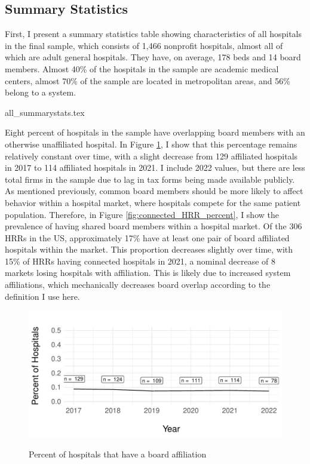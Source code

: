 \documentclass[12pt]{article}
\begin{document}
    \subsection{Summary Statistics}

    First, I present a summary statistics table showing characteristics of all hospitals in the final sample, which consists of 1,466 nonprofit hospitals, almost all of which are adult general hospitals. They have, on average, 178 beds and 14 board members. Almost 40\% of the hospitals in the sample are academic medical centers, almost 70\% of the sample are located in metropolitan areas, and 56\% belong to a system. 

    {all_summarystats.tex}

    Eight percent of hospitals in the sample have overlapping board members with an otherwise unaffiliated hospital. In Figure \ref{fig:connected_percent}, I show that this percentage remains relatively constant over time, with a slight decrease from 129 affiliated hospitals in 2017 to 114 affiliated hospitals in 2021. I include 2022 values, but there are less total firms in the sample due to lag in tax forms being made available publicly. As mentioned previously, common board members should be more likely to affect behavior within a hospital market, where hospitals compete for the same patient population. Therefore, in Figure \ref{fig:connected_HRR_percent}, I show the prevalence of having shared board members within a hospital market. Of the 306 HRRs in the US, approximately 17\% have at least one pair of board affiliated hospitals within the market. This proportion decreases slightly over time, with 15\% of HRRs having connected hospitals in 2021, a nominal decrease of 8 markets losing hospitals with affiliation. This is likely due to increased system affiliations, which mechanically decreases board overlap according to the definition I use here. 


    \begin{figure}[ht!]
        \centering
        \vspace{9mm}
        \caption{Percent of hospitals that have a board affiliation}
        \includegraphics[width=.8\textwidth]{Objects/connected_percent.pdf}
        \label{fig:connected_percent}
    \end{figure}
\end{document}
